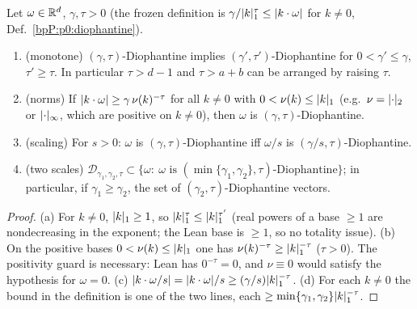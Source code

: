 \begin{lemma}\label{bpP:p1:dio-basic}
Let $\omega\in\mathbb{R}^d$, $\gamma,\tau>0$ (the frozen definition is $\gamma/\lvert k\rvert_1^{\tau}\le\lvert k\cdot\omega\rvert$ for $k\ne0$, Def.~\ref{bpP:p0:diophantine}).
\begin{enumerate}[label=(\alph*)]
\item (monotone) $(\gamma,\tau)$-Diophantine implies $(\gamma',\tau')$-Diophantine for $0<\gamma'\le\gamma$, $\tau'\ge\tau$. In particular $\tau>d-1$ and $\tau>a+b$ can be arranged by raising $\tau$.
\item (norms) If $\lvert k\cdot\omega\rvert\ge\gamma\,\nu(k)^{-\tau}$ for all $k\ne0$ with $0<\nu(k)\le\lvert k\rvert_1$ (e.g.\ $\nu=\lvert \cdot\rvert_2$ or $\lvert \cdot\rvert_\infty$, which are positive on $k\ne0$), then $\omega$ is $(\gamma,\tau)$-Diophantine.
\item (scaling) For $s>0$: $\omega$ is $(\gamma,\tau)$-Diophantine iff $\omega/s$ is $(\gamma/s,\tau)$-Diophantine.
\item (two scales) $\mathcal D_{\gamma_1,\gamma_2,\tau}\subset\{\omega:\ \omega\text{ is }(\min\{\gamma_1,\gamma_2\},\tau)\text{-Diophantine}\}$; in particular, if $\gamma_1\ge\gamma_2$, the set of $(\gamma_2,\tau)$-Diophantine vectors.
\end{enumerate}
\end{lemma}
\begin{proof}
(a) For $k\ne0$, $\lvert k\rvert_1\ge1$, so $\lvert k\rvert_1^{\tau}\le\lvert k\rvert_1^{\tau'}$ (real powers of a base $\ge1$ are nondecreasing in the exponent; the Lean base is $\ge1$, so no totality issue). (b) On the positive bases $0<\nu(k)\le\lvert k\rvert_1$ one has $\nu(k)^{-\tau}\ge\lvert k\rvert_1^{-\tau}$ ($\tau>0$). The positivity guard is necessary: Lean has $0^{-\tau}=0$, and $\nu\equiv0$ would satisfy the hypothesis for $\omega=0$. (c) $\lvert k\cdot\omega/s\rvert=\lvert k\cdot\omega\rvert/s\ge(\gamma/s)\lvert k\rvert_1^{-\tau}$. (d) For each $k\ne0$ the bound in the definition is one of the two lines, each $\ge\min\{\gamma_1,\gamma_2\}\lvert k\rvert_1^{-\tau}$.
\end{proof}

